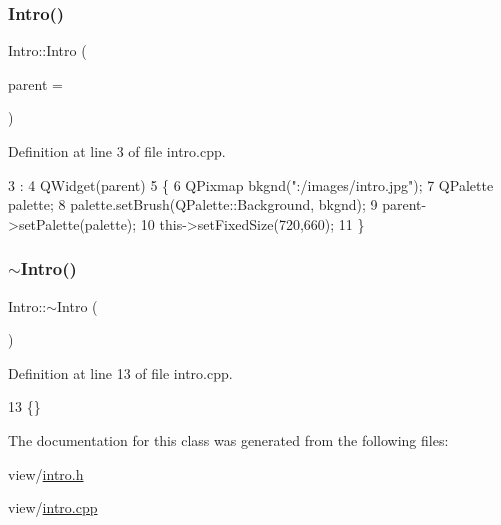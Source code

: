 \subsubsection{\texorpdfstring{Intro()}{Intro()}}
{\footnotesize\ttfamily Intro\+::\+Intro (\begin{DoxyParamCaption}\item[{Q\+Widget $\ast$}]{parent = {} }\end{DoxyParamCaption})\hspace{0.3cm}{\ttfamily [explicit]}}



Definition at line 3 of file intro.\+cpp.


\begin{DoxyCode}
3                             :
4     QWidget(parent)
5 \{
6     QPixmap bkgnd(\textcolor{stringliteral}{":/images/intro.jpg"});
7     QPalette palette;
8     palette.setBrush(QPalette::Background, bkgnd);
9     parent->setPalette(palette);
10     this->setFixedSize(720,660);
11 \}
\end{DoxyCode}
\hypertarget{class_intro_a024067dadaf97daca3bfeb0f22e9c183}{}\label{class_intro_a024067dadaf97daca3bfeb0f22e9c183} 
\subsubsection{\texorpdfstring{$\sim$\+Intro()}{~Intro()}}
{\footnotesize\ttfamily Intro\+::$\sim$\+Intro (\begin{DoxyParamCaption}{ }\end{DoxyParamCaption})}



Definition at line 13 of file intro.\+cpp.


\begin{DoxyCode}
13 \{\}
\end{DoxyCode}


The documentation for this class was generated from the following files\+:\begin{DoxyCompactItemize}
\item 
view/\hyperlink{intro_8h}{intro.\+h}\item 
view/\hyperlink{intro_8cpp}{intro.\+cpp}\end{DoxyCompactItemize}
